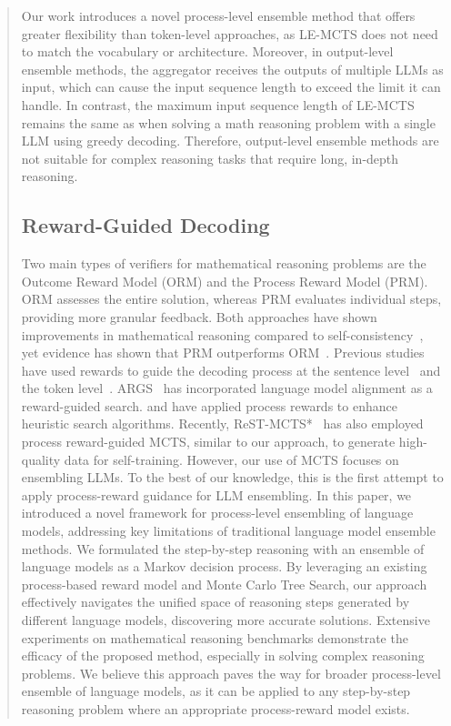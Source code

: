 \documentclass[11pt]{article}
\begin{document}
\begin{abstract}
Our work introduces a novel process-level ensemble method that offers greater flexibility than token-level approaches, as LE-MCTS does not need to match the vocabulary or architecture. 
Moreover, in output-level ensemble methods, the aggregator receives the outputs of multiple LLMs as input, which can cause the input sequence length to exceed the limit it can handle.
In contrast, the maximum input sequence length of LE-MCTS remains the same as when solving a math reasoning problem with a single LLM using greedy decoding. 
Therefore, output-level ensemble methods are not suitable for complex reasoning tasks that require long, in-depth reasoning.

\subsection{Reward-Guided Decoding}
\label{text:relwork:reward_decoding}
Two main types of verifiers for mathematical reasoning problems are the Outcome Reward Model (ORM) and the Process Reward Model (PRM). 
ORM assesses the entire solution, whereas PRM evaluates individual steps, providing more granular feedback. 
Both approaches have shown improvements in mathematical reasoning compared to self-consistency~\citep{wang-etal-2023-selfconsistency}, yet evidence has shown that PRM outperforms ORM~\citep{lightman-etal-2023-prm800k, wang-etal-2024-math}.
Previous studies have used rewards to guide the decoding process at the sentence level~\citep{uesato-etal-2022-oprm, welleck-etal-2022-naturalprover, yao-etal-2024-tree} and the token level~\citep{dathathri-etal-2020-plug, yang-klein-2021-fudge, chaffin-etal-2022-ppl, li-etal-2023-contrastive}. 
ARGS~\citep{khanov-etal-2024-args} has incorporated language model alignment as a reward-guided search. 
\citet{yu-etal-2024-ovm} and \citet{ma-etal-2023-let} have applied process rewards to enhance heuristic search algorithms.
Recently, ReST-MCTS*~\citep{zhang-etal-2024-rest} has also employed process reward-guided MCTS, similar to our approach, to generate high-quality data for self-training.
However, our use of MCTS focuses on ensembling LLMs.
To the best of our knowledge, this is the first attempt to apply process-reward guidance for LLM ensembling.
In this paper, we introduced a novel framework for process-level ensembling of language models, addressing key limitations of traditional language model ensemble methods. 
We formulated the step-by-step reasoning with an ensemble of language models as a Markov decision process. 
By leveraging an existing process-based reward model and Monte Carlo Tree Search, our approach effectively navigates the unified space of reasoning steps generated by different language models, discovering more accurate solutions.
Extensive experiments on mathematical reasoning benchmarks demonstrate the efficacy of the proposed method, especially in solving complex reasoning problems. 
We believe this approach paves the way for broader process-level ensemble of language models, as it can be applied to any step-by-step reasoning problem where an appropriate process-reward model exists.

\end{abstract}
\end{document}
